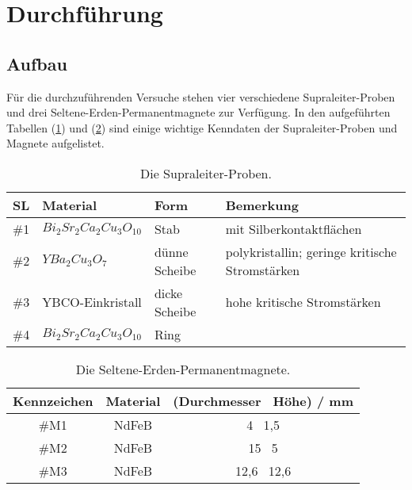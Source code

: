 \section{Durchf\"uhrung}
\label{sec:durchfuehrung}
\subsection{Aufbau}
F\"ur die durchzuf\"uhrenden Versuche stehen vier verschiedene Supraleiter-Proben und drei Seltene-Erden-Permanentmagnete zur Verf\"ugung.
In den aufgef\"uhrten Tabellen (\ref{tab:probenSL}) und (\ref{tab:probenM}) sind einige wichtige Kenndaten der Supraleiter-Proben und Magnete aufgelistet.
\begin{table}
	\centering
	\caption{Die Supraleiter-Proben.}
\begin{tabular}{|c|lll|}
	\hline
	{SL} & {Material} & {Form} & {Bemerkung} \\
	\hline
	\#1 & $Bi_2Sr_2Ca_2Cu_3O_{10}$ & Stab & mit Silberkontaktflächen \\
	\#2 & $YBa_2Cu_3O_7$ & d\"unne Scheibe & polykristallin; geringe kritische Stromstärken \\
	\#3 & YBCO-Einkristall & dicke Scheibe & hohe kritische Stromstärken \\
	\#4 & $Bi_2Sr_2Ca_2Cu_3O_{10}$ & Ring &  \\
	\hline
\end{tabular}
\label{tab:probenSL}
\end{table}
\begin{table}
	\centering
	\caption{Die Seltene-Erden-Permanentmagnete.}
\begin{tabular}{|c|cc|}
	\hline
	{Kennzeichen} & {Material} & {(Durchmesser \times \, H\"ohe) / mm} \\
	\hline
	\#M1 & NdFeB & 4 \times \, 1,5 \\
	\#M2 & NdFeB & 15 \times \, 5 \\
	\#M3 & NdFeB & 12,6 \times \, 12,6 \\
	\hline
\end{tabular}
\label{tab:probenM}
\end{table}

